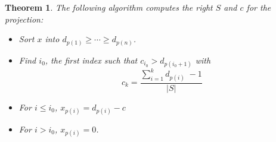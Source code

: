 \documentclass[10pt]{report}
\theoremstyle{plain}
\newtheorem{thm}{Theorem}[chapter]
\newtheorem{lem}[thm]{Lemma}
\theoremstyle{definition}
\theoremstyle{remark}
\newcommand{\R}{\ensuremath{\mathbb{R}}}
\renewcommand{\geq}{\geqslant}
\renewcommand{\leq}{\leqslant}
\DeclareMathOperator{\Span}{Span}
\begin{document}











\begin{thm}
  The following algorithm computes the right $S$ and $c$ for the projection:
\begin{itemize}
\item Sort $x$ into $d_{p(1)} \geq \cdots \geq d_{p(n)}$.
\item Find $i_0$, the first index such that $c_{i_0} > d_{p(i_0+1)}$ with
  \[c_k = \frac{\sum\limits_{i = 1}^{k}\! d_{p(i)}\; -1}{|S|}\]
\item For $i \leq i_0$, $x_{p(i)} = d_{p(i)} - c$
\item For $i > i_0$, $x_{p(i)} = 0$.
\end{itemize}
\end{thm}
\end{document}
